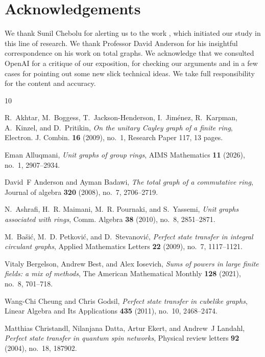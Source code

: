 \documentclass[11pt, a4paper]{amsart}
\theoremstyle{definition}
\numberwithin{equation}{section}
\begin{document}
\section*{Acknowledgements}
We thank Sunil Chebolu for alerting us to the work \cite{invertible_matrices}, which initiated our study in this line of research. We thank Professor David Anderson for his insightful correspondence on his work on total graphs.  We acknowledge that we consulted OpenAI for a critique of  our exposition, for checking our arguments and in a few cases for pointing out some new slick technical ideas. We take full responsibility for the content and accuracy. 



\begin{thebibliography}{10}

R.~Akhtar, M.~Boggess, T.~Jackson-Henderson, I.~Jim{\'e}nez, R.~Karpman, A.~Kinzel, and D.~Pritikin, \emph{On the unitary {Cayley} graph of a finite ring}, Electron. J. Combin. \textbf{16} (2009), no.~1, Research Paper 117, 13 pages.

Eman Alluqmani, \emph{Unit graphs of group rings}, AIMS Mathematics \textbf{11} (2026), no.~1, 2907--2934.

David~F Anderson and Ayman Badawi, \emph{The total graph of a commutative ring}, Journal of algebra \textbf{320} (2008), no.~7, 2706--2719.

N.~Ashrafi, H.~R. Maimani, M.~R. Pournaki, and S.~Yassemi, \emph{Unit graphs associated with rings}, Comm. Algebra \textbf{38} (2010), no.~8, 2851--2871. 

M.~Ba{\v{s}}i{\'c}, M.~D. Petkovi{\'c}, and D.~Stevanovi{\'c}, \emph{Perfect state transfer in integral circulant graphs}, Applied Mathematics Letters \textbf{22} (2009), no.~7, 1117--1121.

Vitaly Bergelson, Andrew Best, and Alex Iosevich, \emph{Sums of powers in large finite fields: a mix of methods}, The American Mathematical Monthly \textbf{128} (2021), no.~8, 701--718.

Wang-Chi Cheung and Chris Godsil, \emph{Perfect state transfer in cubelike graphs}, Linear Algebra and Its Applications \textbf{435} (2011), no.~10, 2468--2474.

Matthias Christandl, Nilanjana Datta, Artur Ekert, and Andrew~J Landahl, \emph{Perfect state transfer in quantum spin networks}, Physical review letters \textbf{92} (2004), no.~18, 187902.


\end{thebibliography}
\end{document}

